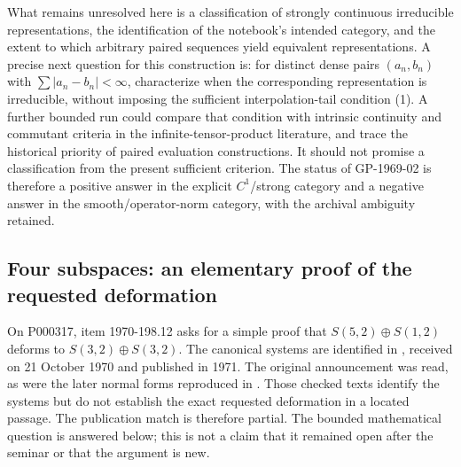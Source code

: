 What remains unresolved here is a classification of strongly
continuous irreducible representations, the identification of the
notebook's intended category, and the extent to which arbitrary
paired sequences yield equivalent representations. A precise next
question for this construction is: for distinct dense pairs
$(a_n,b_n)$ with $\sum|a_n-b_n|<\infty$, characterize when the
corresponding representation is irreducible, without imposing
the sufficient interpolation-tail condition (1). A further bounded
run could compare that condition with intrinsic continuity and
commutant criteria in the infinite-tensor-product literature,
and trace the historical priority of paired evaluation constructions.
It should not promise a classification from the present sufficient
criterion. The status of GP-1969-02 is therefore a positive answer
in the explicit $C^1$/strong category and a negative answer in the
smooth/operator-norm category, with the archival ambiguity retained.

\subsection{Four subspaces: an elementary proof of the requested deformation}
\label{dev:four-subspaces}

On P000317, item 1970-198.12 asks for a simple proof that
$S(5,2)\oplus S(1,2)$ deforms to $S(3,2)\oplus S(3,2)$.
The canonical systems are identified in
\citet[\S2]{gelfandponomarev1971quadruples}, received on
21 October 1970 and published in 1971. The original announcement
was read, as were the later normal forms reproduced in
\citet[\S9]{enomotowatatani2004subspaces}. Those checked texts
identify the systems but do not establish the exact requested
deformation in a located passage. The publication match is therefore
partial. The bounded mathematical question is answered below;
this is not a claim that it remained open after the seminar or
that the argument is new.

